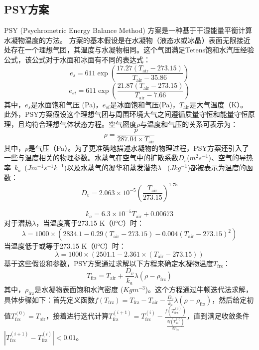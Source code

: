 \subsection{PSY方案}
PSY (Psychrometric Energy Balance Method) 方案是一种基于干湿能量平衡计算水凝物温度的方法。
方案的基本假设是在水凝物（液态水或冰晶）表面无限接近处存在一个理想气团，其温度与水凝物相同。这个气团满足Tetens饱和水汽压经验公式，该公式对于水面和冰面有不同的表达式：
\begin{equation}
e_s = 611 \exp\left(\frac{17.27(T_{\mathrm{air}} - 273.15)}{T_{\mathrm{air}} - 35.86}\right)
\end{equation}
\begin{equation}
e_{si} = 611 \exp\left(\frac{21.87(T_{\mathrm{air}} - 273.15)}{T_{\mathrm{air}} - 7.66}\right)
\end{equation}
其中，$e_s$是水面饱和气压 (Pa)，$e_{si}$是冰面饱和气压(Pa)，$T_{\mathrm{air}}$是大气温度（K）。 此外，PSY方案假设这个理想气团与周围环境大气之间遵循质量守恒和能量守恒原理，且均符合理想气体状态方程。空气密度$\rho$与温度和气压的关系可表示为：
\begin{equation}
\rho = \frac{p}{287.04 \times T_{\mathrm{air}} }
\end{equation}
其中，$p$是气压（Pa）。为了更准确地描述水凝物的物理过程，PSY方案还引入了一些与温度相关的物理参数。水蒸气在空气中的扩散系数$D_v$($m^2 s^{-1}$)、空气的导热率~$k_a$~($J m^{-1} s^{-1} k^{-1}$)以及水蒸气的凝华和蒸发潜热$\lambda$ ~($J kg^{-1}$)都被表示为温度的函数：
\begin{equation}
D_v = 2.063 \times 10^{-5} \left(\frac{T_{\mathrm{air}}}{273.15}\right)^{1.75}
\end{equation}

\begin{equation}
k_a = 6.3 \times 10^{-5} T_{\mathrm{air}} + 0.00673
\end{equation}
对于潜热$\lambda$，当温度高于273.15 K（0°C）时：
\begin{equation}
\lambda = 1000\times(2834.1 - 0.29(T_{\mathrm{air}}-273.15) - 0.004(T_{\mathrm{air}}-273.15)^2)
\end{equation}
当温度低于或等于273.15 K（0°C）时：
\begin{equation}
\lambda = 1000\times(2501.1 - 2.361\times(T_{\mathrm{air}}-273.15))
\end{equation}
基于这些假设和参数，PSY方案通过求解以下方程来确定水凝物温度$T_{\mathrm{frz}}$：
\begin{equation}
\label{eq:水凝物表面空气温度定义}
T_{\mathrm{frz}} = T_{\mathrm{air}} + \frac{D_v}{k_a} \lambda (\rho - \rho_{\mathrm{frz}})
\end{equation}
其中，$\rho_{\mathrm{frz}}$是水凝物表面饱和水汽密度 ($Kg m^{-3}$)。这个方程通过牛顿迭代法求解，具体步骤如下：首先定义函数$f(T_{\mathrm{frz}}) = T_{\mathrm{frz}} - T_{\mathrm{air}} - \frac{D_v}{k_a} \lambda (\rho - \rho_{\mathrm {frz}})$，然后给定初值$T_{\mathrm{frz}}^{(0)} = T_{\mathrm{air}}$，接着进行迭代计算$T_{\mathrm {frz}}^{(i+1)} = T_{\mathrm {frz}}^{(i)} - \frac{f(T_{\mathrm {frz}}^{(i)})}{\frac{df(T_{\mathrm {frz}}^{(i)})}{dT_{\mathrm {frz}}}}$，直到满足收敛条件$|T_{\mathrm {frz}}^{(i+1)} - T_{\mathrm {frz}}^{(i)}| < 0.01$。

